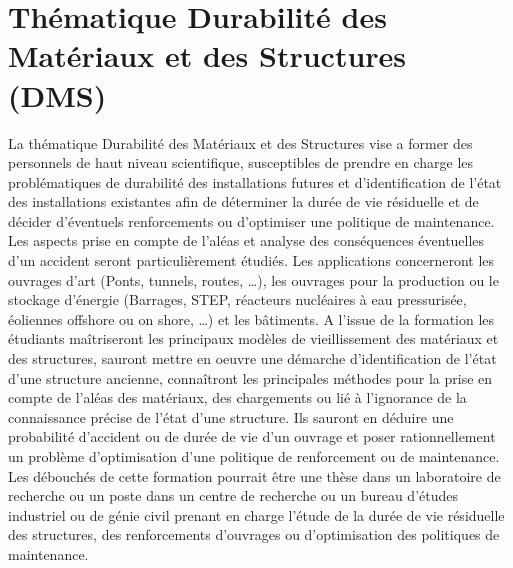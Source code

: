 \documentclass[french,11pt]{article}
\begin{document}
\section{Thématique Durabilité des Matériaux et des Structures (DMS)}
La thématique Durabilité des Matériaux et des Structures  vise a former des personnels de haut niveau scientifique, susceptibles de prendre en charge les problématiques de durabilité des installations futures et d'identification de l'état des installations existantes afin de déterminer la durée de vie résiduelle et de décider d'éventuels renforcements ou d'optimiser une politique de maintenance.
Les aspects prise en compte de l'aléas et analyse des conséquences éventuelles d'un accident seront particulièrement étudiés.
Les applications concerneront les ouvrages d'art (Ponts, tunnels,  routes, \ldots), les ouvrages pour la production ou le stockage d'énergie (Barrages, STEP, réacteurs nucléaires à eau pressurisée, éoliennes offshore ou on shore, \ldots) et les bâtiments.
A l'issue de la formation les étudiants maîtriseront les principaux modèles de vieillissement des matériaux et des structures, sauront mettre en oeuvre une démarche d'identification de l'état d'une structure ancienne, connaîtront les principales méthodes pour la prise en compte de l'aléas des matériaux, des chargements ou lié à l'ignorance de la connaissance précise de l'état d'une structure.
Ils sauront en déduire une probabilité d'accident ou de durée de vie d'un ouvrage et poser rationnellement un problème d'optimisation d'une politique de renforcement ou de maintenance.
Les débouchés de cette formation pourrait être une thèse dans un laboratoire de recherche ou un poste dans un centre de recherche ou un bureau d'études industriel ou de génie civil prenant en charge l'étude de la durée de vie résiduelle des structures, des renforcements d'ouvrages ou d'optimisation des politiques de maintenance. 
\end{document}
